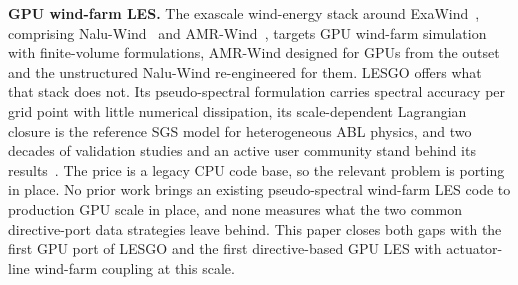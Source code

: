 \textbf{GPU wind-farm LES.} The exascale wind-energy stack around
ExaWind~\cite{sharma2024exawind}, comprising
Nalu-Wind~\cite{mullowney2021} and AMR-Wind~\cite{kuhn2025amrwind},
targets GPU wind-farm simulation with finite-volume formulations,
AMR-Wind designed for GPUs from the outset and the unstructured
Nalu-Wind re-engineered for them. LESGO
offers what that stack does not. Its pseudo-spectral formulation
carries spectral accuracy per grid point with little numerical
dissipation, its scale-dependent Lagrangian closure is the reference
SGS model for heterogeneous ABL physics, and two decades of
validation studies and an active user community stand behind its
results~\cite{bouzeid2005,calaf2010}. The price is a legacy CPU code
base, so the relevant problem is porting in place. No prior work
brings an existing pseudo-spectral wind-farm LES code to production
GPU scale in place, and none measures what the two common
directive-port data strategies leave behind. This paper closes both
gaps with the first GPU port of LESGO and the first directive-based
GPU LES with actuator-line wind-farm coupling at this scale.
